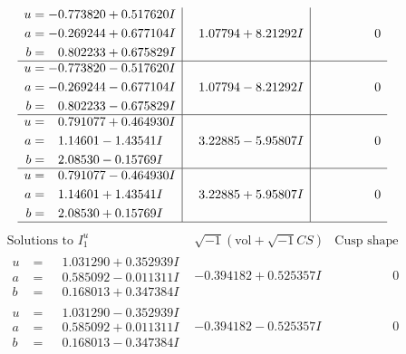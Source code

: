 \documentclass[1p]{elsarticle_modified}
\theoremstyle{definition}
\newcommand{\I}{\sqrt{-1}}
\begin{document}
$$\begin{array}{c|c|c}
\begin{aligned}
u &= -0.773820 + 0.517620 I \\
a &= -0.269244 + 0.677104 I \\
b &= \phantom{-}0.802233 + 0.675829 I\end{aligned}
 & \phantom{-}1.07794 + 8.21292 I & \phantom{-0.000000 } 0 \\ \hline\begin{aligned}
u &= -0.773820 - 0.517620 I \\
a &= -0.269244 - 0.677104 I \\
b &= \phantom{-}0.802233 - 0.675829 I\end{aligned}
 & \phantom{-}1.07794 - 8.21292 I & \phantom{-0.000000 } 0 \\ \hline\begin{aligned}
u &= \phantom{-}0.791077 + 0.464930 I \\
a &= \phantom{-}1.14601 - 1.43541 I \\
b &= \phantom{-}2.08530 - 0.15769 I\end{aligned}
 & \phantom{-}3.22885 - 5.95807 I & \phantom{-0.000000 } 0 \\ \hline\begin{aligned}
u &= \phantom{-}0.791077 - 0.464930 I \\
a &= \phantom{-}1.14601 + 1.43541 I \\
b &= \phantom{-}2.08530 + 0.15769 I\end{aligned}
 & \phantom{-}3.22885 + 5.95807 I & \phantom{-0.000000 } 0\\
 \hline 
 \end{array}$$\newpage$$\begin{array}{c|c|c}  
\text{Solutions to }I^u_{1}& \I (\text{vol} + \sqrt{-1}CS) & \text{Cusp shape}\\
 \hline 
\begin{aligned}
u &= \phantom{-}1.031290 + 0.352939 I \\
a &= \phantom{-}0.585092 - 0.011311 I \\
b &= \phantom{-}0.168013 + 0.347384 I\end{aligned}
 & -0.394182 + 0.525357 I & \phantom{-0.000000 } 0 \\ \hline\begin{aligned}
u &= \phantom{-}1.031290 - 0.352939 I \\
a &= \phantom{-}0.585092 + 0.011311 I \\
b &= \phantom{-}0.168013 - 0.347384 I\end{aligned}
 & -0.394182 - 0.525357 I & \phantom{-0.000000 } 0 \\ \hline\begin{aligned}

\end{aligned}
\end{array}$$
\end{document}
